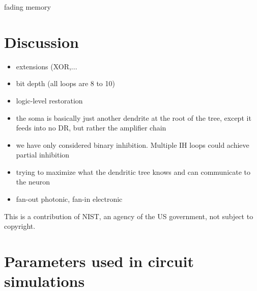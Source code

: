\documentclass[twocolumn]{article}
\begin{document}
\begin{figure} 
\end{figure}
fading memory

\section{\label{sec:discussion}Discussion}
\begin{itemize}
\item extensions (XOR,...
\item bit depth (all loops are 8 to 10)
\item logic-level restoration
\item the soma is basically just another dendrite at the root of the tree, except it feeds into no DR, but rather the amplifier chain
\item we have only considered binary inhibition. Multiple IH loops could achieve partial inhibition
\item trying to maximize what the dendritic tree knows and can communicate to the neuron
\item fan-out photonic, fan-in electronic
\end{itemize}

\vspace{0.5em}
This is a contribution of NIST, an agency of the US government, not subject to copyright.
	
\newpage
\appendix
\section{\label{apx:circuit_parameters}Parameters used in circuit simulations}



\end{document}

